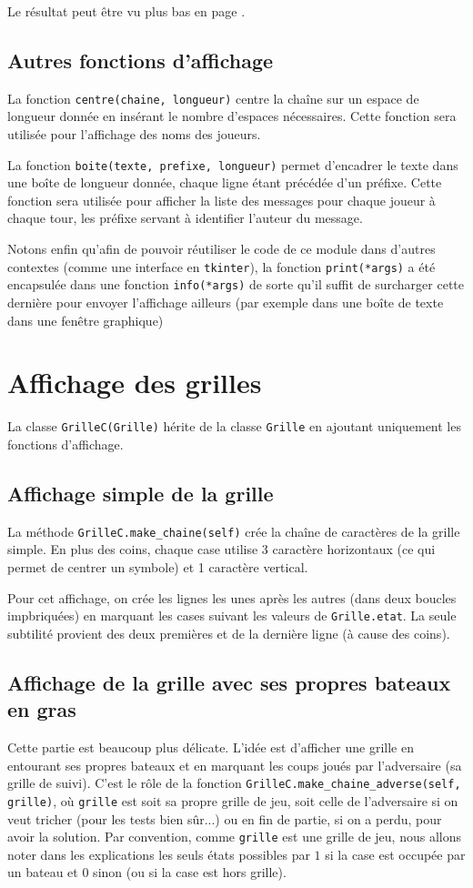 Le résultat peut être vu plus bas en page \pageref{deux_joueurs}.

\subsection{Autres fonctions d'affichage}
La fonction \texttt{centre(chaine, longueur)} centre la chaîne sur un espace de longueur donnée en insérant le nombre d'espaces nécessaires. Cette fonction sera utilisée pour l'affichage des noms des joueurs.

La fonction \texttt{boite(texte, prefixe, longueur)} permet d'encadrer le texte dans une boîte de longueur donnée, chaque ligne étant précédée d'un préfixe. Cette fonction sera utilisée pour afficher la liste des messages pour chaque joueur à chaque tour, les préfixe servant à identifier l'auteur du message.

Notons enfin qu'afin de pouvoir réutiliser le code de ce module dans d'autres contextes (comme une interface en \texttt{tkinter}), la fonction \texttt{print(*args)} a été encapsulée dans une fonction \texttt{info(*args)} de sorte qu'il suffit de surcharger cette dernière pour envoyer l'affichage ailleurs (par exemple dans une boîte de texte dans une fenêtre graphique)

\section{Affichage des grilles}
La classe \texttt{GrilleC(Grille)} hérite de la classe \texttt{Grille} en ajoutant uniquement les fonctions d'affichage.

\subsection{Affichage simple de la grille}
La méthode \texttt{GrilleC.make\_chaine(self)} crée la chaîne de caractères de la grille simple. En plus des coins, chaque case utilise 3 caractère horizontaux (ce qui permet de centrer un symbole) et 1 caractère vertical.

Pour cet affichage, on crée les lignes les unes après les autres (dans deux boucles impbriquées) en marquant les cases suivant les valeurs de \texttt{Grille.etat}. La seule subtilité provient des deux premières et de la dernière ligne (à cause des coins).


\subsection{Affichage de la grille avec ses propres bateaux en gras}
Cette partie est beaucoup plus délicate. L'idée est d'afficher une grille en entourant ses propres bateaux et en marquant les coups joués par l'adversaire (sa grille de suivi). C'est le rôle de la fonction \texttt{GrilleC.make\_chaine\_adverse(self, grille)}, où \texttt{grille} est soit sa propre grille de jeu, soit celle de l'adversaire si on veut tricher (pour les tests bien sûr...) ou en fin de partie, si on a perdu, pour avoir la solution. Par convention, comme \texttt{grille} est une grille de jeu, nous allons noter dans les explications les seuls états possibles par $1$ si la case est occupée par un bateau et $0$ sinon (ou si la case est hors grille).

